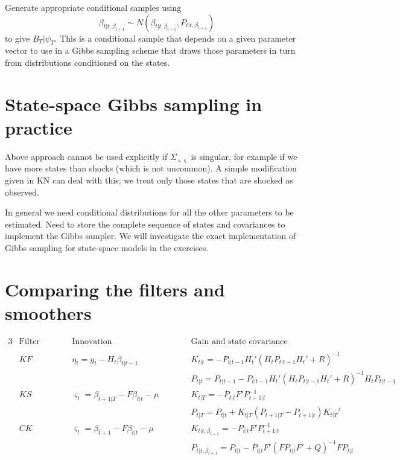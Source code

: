 \documentclass[
  letterpaper,
]{book}
\begin{document}
Generate appropriate conditional samples using \begin{equation}
  \beta_{t|t,\beta_{t+1}} \sim N\left(\beta_{t|t,\beta_{t+1}}, P_{t|t,\beta_{t+1}} \right)
\end{equation} to give \(B_T|\psi_T\). This is a conditional sample that
depends on a given parameter vector to use in a Gibbs sampling scheme
that draws those parameters in turn from distributions conditioned on
the states.

\hypertarget{state-space-gibbs-sampling-in-practice}{%
\section{State-space Gibbs sampling in
practice}\label{state-space-gibbs-sampling-in-practice}}

Above approach cannot be used explicitly if
\(\Sigma_{\varsigma\varsigma}\) is singular, for example if we have more
states than shocks (which is not uncommon). A simple modification given
in KN can deal with this; we treat only those states that are shocked as
observed.

In general we need conditional distributions for all the other
parameters to be estimated. Need to store the complete sequence of
states and covariances to implement the Gibbs sampler. We will
investigate the exact implementation of Gibbs sampling for state-space
models in the exercises.

\hypertarget{comparing-the-filters-and-smoothers}{%
\section{Comparing the filters and
smoothers}\label{comparing-the-filters-and-smoothers}}

\begin{alignat*}{3}
&\text{Filter} & &\text{Innovation} & & \text{Gain and state covariance}  \\
& && &&\\
&KF &\qquad\ &\eta_t = y_t-H_t\beta_{t|t-1} && K_{t|t} =-P_{t|t-1}H_t' (H_t P_{t|t-1} H_t' + R)^{-1} \\
& &&  && P_{t|t} = P_{t|t-1}-P_{t|t-1} H_t'(H_t P_{t|t-1} H_t' +R)^{-1} H_t P_{t|t-1} \\
&KS && \varsigma_t = \beta_{t+1|T}-F\beta_{t|t}-\mu & \qquad\ & K_{t|T}=-P_{t|t}F' P_{t+1|t}^{-1} \\
&   &&      && P_{t|T} = P_{t|t}+K_{t|T}(P_{t+1|T}-P_{t+1|t}) K_{t|T}' \\
&CK && \varsigma_t = \beta_{t+1}-F\beta_{t|t}-\mu && K_{t|t,\beta_{t+1}} = -P_{t|t}F' P_{t+1|t}^{-1} \\ 
&   &&   && P_{t|t,\beta_{t+1}} = P_{t|t}-P_{t|t}F'(FP_{t|t}F' + Q)^{-1}FP_{t|t}
\end{alignat*}
\end{document}
